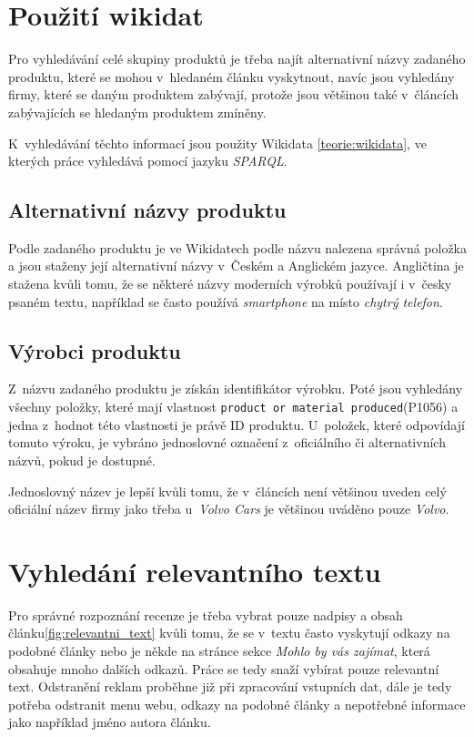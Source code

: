 \section{Použití wikidat}
Pro vyhledávání celé skupiny produktů je třeba najít alternativní názvy zadaného produktu, které se mohou v~hledaném článku vyskytnout, navíc jsou vyhledány firmy, které se daným produktem zabývají, protože jsou většinou také v~článcích zabývajících se hledaným produktem zmíněny.

K~vyhledávání těchto informací jsou použity Wikidata \ref{teorie:wikidata}, ve kterých práce vyhledává pomocí jazyku \textit{SPARQL}. 

\subsection*{Alternativní názvy produktu}
Podle zadaného produktu je ve Wikidatech podle názvu nalezena správná položka a jsou staženy její alternativní názvy v~Českém a Anglickém jazyce. Angličtina je stažena kvůli tomu, že se některé názvy moderních výrobků používají i v~česky psaném textu, například se často používá \textit{smartphone} na místo \textit{chytrý telefon}.

\subsection*{Výrobci produktu}
Z~názvu zadaného produktu je získán identifikátor výrobku. Poté jsou vyhledány všechny položky, které mají vlastnost \verb|product or material produced|(P1056) a jedna z~hodnot této vlastnosti je právě ID produktu.
U~položek, které odpovídají tomuto výroku, je vybráno jednoslovné označení z~oficiálního či alternativních názvů, pokud je dostupné. 

Jednoslovný název je lepší kvůli tomu, že v~článcích není většinou uveden celý oficiální název firmy jako třeba u~\textit{Volvo Cars} je většinou uváděno pouze \textit{Volvo}.

\section{Vyhledání relevantního textu}
Pro správné rozpoznání recenze je třeba vybrat pouze nadpisy a obsah článku\ref{fig:relevantni_text} kvůli tomu, že se v~textu často vyskytují odkazy na podobné články nebo je někde na stránce sekce \textit{Mohlo by vás zajímat}, která obsahuje mnoho dalších odkazů. Práce se tedy snaží vybírat pouze relevantní text. Odstranění reklam proběhne již při zpracování vstupních dat, dále je tedy potřeba odstranit menu webu, odkazy na podobné články a nepotřebné informace jako například jméno autora článku.

